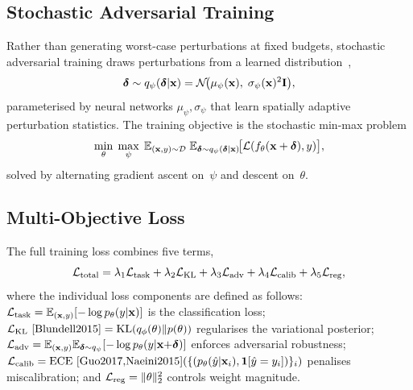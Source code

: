 \subsection{Stochastic Adversarial Training}

Rather than generating worst-case perturbations at fixed budgets, stochastic adversarial training draws perturbations from a learned distribution~\cite{Madry2018,Zhang2019trades,Shafahi2019},
\begin{equation}
\boldsymbol{\delta}\sim q_\psi(\boldsymbol{\delta}|\mathbf{x})
= \mathcal{N}\!\bigl(\mu_\psi(\mathbf{x}),\;\sigma_\psi(\mathbf{x})^2\mathbf{I}\bigr),
\label{eq:stoch_pert_dist}
\end{equation}
parameterised by neural networks $\mu_\psi,\sigma_\psi$ that learn spatially adaptive perturbation statistics. The training objective is the stochastic min-max problem
\begin{equation}
\min_\theta\;\max_\psi\;
\mathbb{E}_{(\mathbf{x},y)\sim\mathcal{D}}\;
\mathbb{E}_{\boldsymbol{\delta}\sim q_\psi(\boldsymbol{\delta}|\mathbf{x})}\!
\bigl[\mathcal{L}(f_\theta(\mathbf{x}+\boldsymbol{\delta}),y)\bigr],
\label{eq:stoch_adv_obj}
\end{equation}
solved by alternating gradient ascent on~$\psi$ and descent on~$\theta$.

\subsection{Multi-Objective Loss}

The full training loss combines five terms,\begin{equation}
\mathcal{L}_{\mathrm{total}}
= \lambda_1\mathcal{L}_{\mathrm{task}}
+ \lambda_2\mathcal{L}_{\mathrm{KL}}
+ \lambda_3\mathcal{L}_{\mathrm{adv}}
+ \lambda_4\mathcal{L}_{\mathrm{calib}}
+ \lambda_5\mathcal{L}_{\mathrm{reg}},
\label{eq:stoch_total_loss}
\end{equation}
where the individual loss components are defined as follows:
$\mathcal{L}_{\mathrm{task}}=\mathbb{E}_{(\mathbf{x},y)}[-\log p_\theta(y|\mathbf{x})]$ is the
classification loss;
$\mathcal{L}_{\mathrm{KL}}~\cite{Blundell2015}=\mathrm{KL}(q_\phi(\theta)\|p(\theta))$
regularises the variational posterior;
$\mathcal{L}_{\mathrm{adv}}=\mathbb{E}_{(\mathbf{x},y)}\mathbb{E}_{\boldsymbol{\delta}\sim q_\psi}[-\log p_\theta(y|\mathbf{x}{+}\boldsymbol{\delta})]$
enforces adversarial robustness;
$\mathcal{L}_{\mathrm{calib}}=\mathrm{ECE}~\cite{Guo2017,Naeini2015}(\{(p_\theta(\hat{y}|\mathbf{x}_i),\mathbf{1}[\hat{y}=y_i])\}_i)$
penalises miscalibration; and $\mathcal{L}_{\mathrm{reg}}=\|\theta\|_2^2$
controls weight magnitude.

